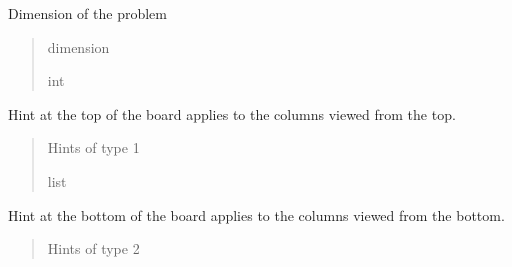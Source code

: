 \documentclass[letterpaper,10pt,english]{sphinxmanual}
\begin{document}
\begin{fulllineitems}
\begin{fulllineitems}
\end{fulllineitems}


\begin{fulllineitems}
\label{\detokenize{hints:hints.HintsData.dim}}
\pysigstartsignatures
{}
\pysigstopsignatures
\sphinxAtStartPar
Dimension of the problem
\begin{quote}\begin{description}
\sphinxAtStartPar
dimension

\sphinxAtStartPar
int

\end{description}\end{quote}

\end{fulllineitems}


\begin{fulllineitems}
\label{\detokenize{hints:hints.HintsData.topHint}}
\pysigstartsignatures
{}
\pysigstopsignatures
\sphinxAtStartPar
Hint at the top of the board applies to the columns viewed             from the top.
\begin{quote}\begin{description}
\sphinxAtStartPar
Hints of type 1

\sphinxAtStartPar
list

\end{description}\end{quote}

\end{fulllineitems}


\begin{fulllineitems}
\label{\detokenize{hints:hints.HintsData.botHint}}
\pysigstartsignatures
{}
\pysigstopsignatures
\sphinxAtStartPar
Hint at the bottom of the board applies to the columns viewed             from the bottom.
\begin{quote}\begin{description}
\sphinxAtStartPar
Hints of type 2


\end{description}
\end{quote}
\end{fulllineitems}
\end{fulllineitems}
\end{document}
